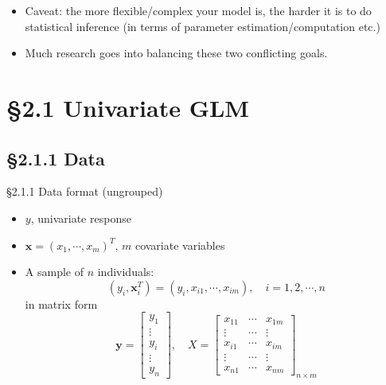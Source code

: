\documentclass{beamer}
\newcommand{\currentsection}{}
\let\oldsection\section
\renewcommand{\section}[1]{\oldsection{#1}\renewcommand{\currentsection}{#1}}
\newcommand{\currentsubsection}{}
\let\oldsubsection\subsection
\renewcommand{\subsection}[1]{\oldsubsection{#1}\renewcommand{\currentsubsection}{#1}}
\newenvironment{wideitemize}%
  {\begin{itemize}%
    \setlength{\parskip}{1em}}%
  {\end{itemize}}
\begin{document}
\begin{frame}
\begin{wideitemize}
\item Caveat: the more flexible/complex your model is, the harder it is to do statistical inference (in terms of parameter estimation/computation etc.)
\item Much  research goes into balancing these two conflicting goals.

\end{wideitemize}

\end{frame}


\section{\S 2.1 Univariate GLM}\label{sec:2.1}
\subsection{\S 2.1.1 Data}

\begin{frame}{\S 2.1.1 Data format (ungrouped)}
\begin{itemize}
\item
$y$, univariate response

\item  $\textbf{x}=(x_1,\cdots,x_m)^T$, $m$ covariate variables

\item
A sample of $n$ individuals: 
$$(y_i, \textbf{x}_i^T)=(y_i, x_{i1},\cdots, x_{im}), \quad i=1,2,\cdots,n$$
 in matrix form
\begin{equation*}
\textbf{y}=\left[\begin{array}{c} y_1 \\ \vdots \\ y_i \\ \vdots \\ y_n\end{array}\right], \quad
X=\left[\begin{array}{ccc} x_{11} & \cdots & x_{1m} \\ \vdots & \cdots & \vdots \\
x_{i1} & \cdots & x_{im} \\ \vdots & \cdots & \vdots \\ x_{n1} & \cdots & x_{nm} \end{array}
\right]_{n\times m}
\end{equation*}
\end{itemize}
\end{frame}
\end{document}
